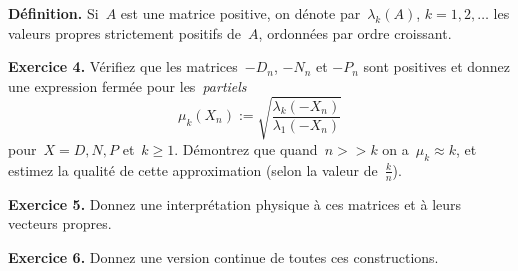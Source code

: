 {\bf Définition.}
Si~$A$ est une matrice positive, on dénote par~$\lambda_k(A)$, $k=1,2,\ldots$
les valeurs propres strictement positifs de~$A$, ordonnées par ordre croissant.

{\bf Exercice 4.}
Vérifiez que les matrices~$-D_n$, $-N_n$ et $-P_n$ sont positives et donnez une
expression fermée pour les~\emph{partiels}
\[
	\mu_k(X_n) := \sqrt{\frac{\lambda_k(-X_n)}{\lambda_1(-X_n)}}
\]
pour~$X=D,N,P$ et~$k\ge 1$.  Démontrez que quand~$n>>k$ on a~$\mu_k\approx k$,
et estimez la qualité de cette approximation (selon la valeur de~$\tfrac kn$).

{\bf Exercice 5.}
Donnez une interprétation physique à ces matrices et à leurs vecteurs propres.

{\bf Exercice 6.}
Donnez une version continue de toutes ces constructions.





